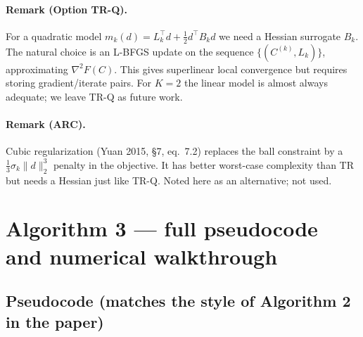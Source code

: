 \documentclass[11pt,a4paper]{article}
\begin{document}
\paragraph{Remark (Option TR-Q).} For a quadratic model $m_k(d) = L_k^\top d + \tfrac12 d^\top B_k d$ we need a Hessian surrogate $B_k$. The natural choice is an L-BFGS update on the sequence $\{(C^{(k)}, L_k)\}$, approximating $\nabla^2 F(C)$. This gives superlinear local convergence but requires storing gradient/iterate pairs. For $K = 2$ the linear model is almost always adequate; we leave TR-Q as future work.

\paragraph{Remark (ARC).} Cubic regularization (Yuan 2015, \S 7, eq.\ 7.2) replaces the ball constraint by a $\tfrac13\sigma_k\|d\|_2^3$ penalty in the objective. It has better worst-case complexity than TR but needs a Hessian just like TR-Q. Noted here as an alternative; not used.

\section{Algorithm 3 --- full pseudocode and numerical walkthrough}

\subsection{Pseudocode (matches the style of Algorithm 2 in the paper)}
\end{document}

